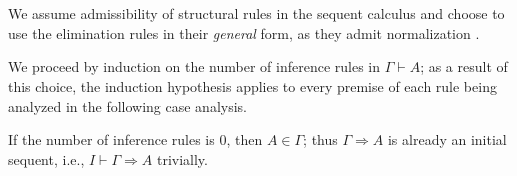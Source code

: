 \documentclass[a4paper]{article}
\newcommand{\seqarr}{\Rightarrow}
\begin{document}
\section{}
We assume admissibility of structural rules in the sequent calculus and choose to use the elimination rules in their \emph{general} form, as they admit normalization \cite[Section 1.2]{Negri2001}.

We proceed by induction on the number of inference rules in $\Gamma \vdash A$; as a result of this choice, the induction hypothesis applies to every premise of each rule being analyzed in the following case analysis.

If the number of inference rules is 0, then $A \in \Gamma$; thus $\Gamma \seqarr A$ is already an initial sequent, i.e., $I \vdash \Gamma \seqarr A$ trivially.
\end{document}
